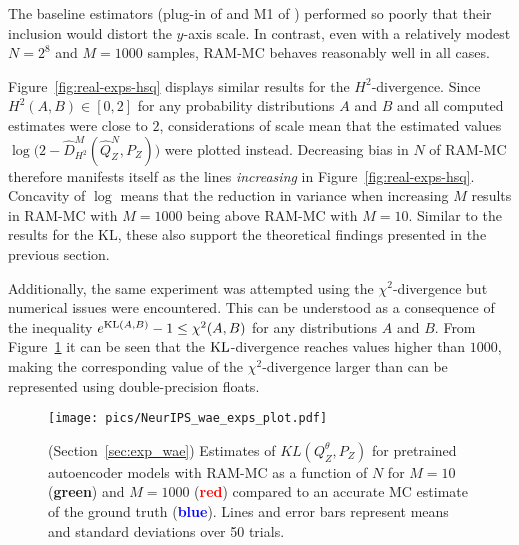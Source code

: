 The baseline estimators (plug-in of \cite{moon14ensemble} and M1 of \cite{nguyen10ratio}) performed so poorly that 
their inclusion would distort the $y$-axis scale.
In contrast, even with a relatively modest $N{=}2^8$ and $M{=}1000$ samples, RAM-MC behaves reasonably well in all cases.

Figure~\ref{fig:real-exps-hsq} displays similar results for the $H^2$-divergence.
Since $H^2(A,B) \in [0, 2]$ for any probability distributions $A$ and $B$ and all computed estimates were close to $2$,
considerations of scale mean that the estimated values $\log\big(2 - \hat{D}^M_{H^2}(\hat{Q}^N_Z , P_Z)\big)$ were plotted instead.
Decreasing bias in $N$ of RAM-MC therefore manifests itself as the lines \emph{increasing} in Figure~\ref{fig:real-exps-hsq}. 
Concavity of $\log$ means that the reduction in variance when increasing $M$ results in RAM-MC with $M{=}1000$ being above RAM-MC with $M{=}10$.
Similar to the results for the KL, these also support the theoretical findings presented in the previous section.

Additionally, the same experiment was attempted using the $\chi^2$-divergence but numerical issues were encountered.
This can be understood as a consequence of the inequality $e^{\mathrm{KL}(A, B)} - 1 \leq \chi^2(A,B)$ for any distributions $A$ and $B$. 
From Figure~\ref{fig:real-exps} it can be seen that the $\mathrm{KL}$-divergence reaches values higher than $1000$, making the corresponding value of the $\chi^2$-divergence larger than can be represented using double-precision floats.




\begin{figure}
\begin{center}
\texttt{[image: pics/NeurIPS\_wae\_exps\_plot.pdf]}
\end{center}
\caption{\label{fig:real-exps}
(Section~\ref{sec:exp_wae}) Estimates of $KL(Q_Z^\theta , P_Z)$ for pretrained autoencoder models with RAM-MC as a function of $N$ for $M{=}10$ ({\bf \textcolor{green!65!blue}{green}}) and $M{=}1000$ ({\bf \textcolor{red}{red}}) compared to an accurate MC estimate of the ground truth ({\bf\textcolor{blue}{blue}}).
Lines and error bars represent means and standard deviations over 50 trials.
}
\end{figure}



